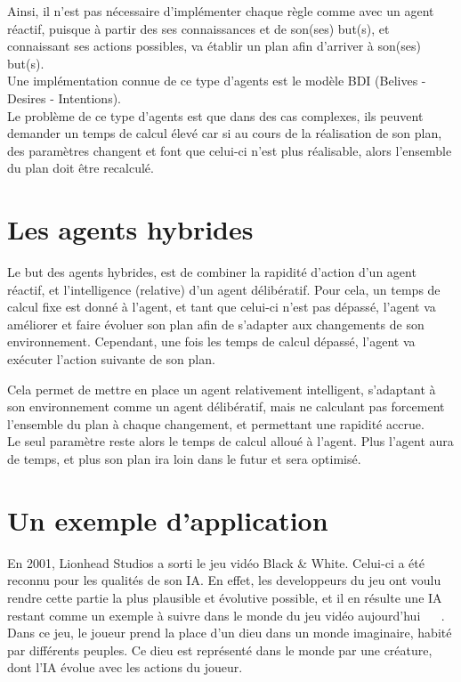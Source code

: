 \documentclass[asi]{picINSA}
\begin{document}
Ainsi, il n'est pas nécessaire d'implémenter chaque règle comme avec un agent réactif, puisque à partir des ses connaissances et de son(ses) but(s), et connaissant ses actions possibles, va établir un plan afin d'arriver à son(ses) but(s).\\
Une implémentation connue de ce type d'agents est le modèle BDI (Belives - Desires - Intentions).\\
Le problème de ce type d'agents est que dans des cas complexes, ils peuvent demander un temps de calcul élevé car si au cours de la réalisation de son plan, des paramètres changent et font que celui-ci n'est plus réalisable, alors l'ensemble du plan doit être recalculé.

\section{Les agents hybrides}
Le but des agents hybrides, est de combiner la rapidité d'action d'un agent réactif, et l'intelligence (relative) d'un agent délibératif.
Pour cela, un temps de calcul fixe est donné à l'agent, et tant que celui-ci n'est pas dépassé, l'agent va améliorer et faire évoluer son plan afin de s'adapter aux changements de son environnement. Cependant, une fois les temps de calcul dépassé, l'agent va exécuter l'action suivante de son plan.

Cela permet de mettre en place un agent relativement intelligent, s'adaptant à son environnement comme un agent délibératif, mais ne calculant pas forcement l'ensemble du plan à chaque changement, et permettant une rapidité accrue.\\
Le seul paramètre reste alors le temps de calcul alloué à l'agent. Plus l'agent aura de temps, et plus son plan ira loin dans le futur et sera optimisé.

\section{Un exemple d'application}
En 2001, Lionhead Studios a sorti le jeu vidéo Black \& White. Celui-ci a été reconnu pour les qualités de son IA. En effet, les developpeurs du jeu ont voulu rendre cette partie la plus plausible et évolutive possible, et il en résulte une IA restant comme un exemple à suivre dans le monde du jeu vidéo aujourd'hui ~\cite{MindGames} ~\cite{CompGamesWithIntel}.\\
Dans ce jeu, le joueur prend la place d'un dieu dans un monde imaginaire, habité par différents peuples. Ce dieu est représenté dans le monde par une créature, dont l'IA évolue avec les actions du joueur.\\
\end{document}
